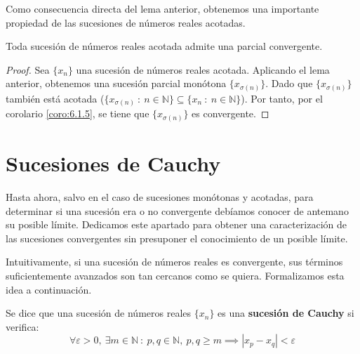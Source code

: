 Como consecuencia directa del lema anterior, obtenemos una importante propiedad de las sucesiones de números reales acotadas.
\begin{teo}
    Toda sucesión de números reales acotada admite una parcial convergente.
\end{teo}
\begin{proof}
    Sea $\{x_n\}$ una sucesión de números reales acotada. Aplicando el lema anterior, obtenemos una sucesión parcial monótona $\{x_{\sigma(n)}\}$. Dado que $\{x_{\sigma(n)}\}$ también está acotada ($\{x_{\sigma(n)} ~:~ n \in \mathbb{N}\} \subseteq \{x_n ~:~ n \in \mathbb{N}\}$). Por tanto, por el corolario \ref{coro:6.1.5}, se tiene que $\{x_{\sigma(n)}\}$ es convergente.
\end{proof}


\section{Sucesiones de Cauchy}
Hasta ahora, salvo en el caso de sucesiones monótonas y acotadas, para determinar si una sucesión era o no
convergente debíamos conocer de antemano su posible límite. Dedicamos este apartado para obtener una caracterización de las sucesiones convergentes sin presuponer el conocimiento de un posible límite.

Intuitivamente, si una sucesión de números reales es convergente, sus términos suficientemente avanzados son tan cercanos como se quiera. Formalizamos esta idea a continuación.
\begin{definicion}
    Se dice que una sucesión de números reales $\{x_n\}$ es una \textbf{sucesión de Cauchy} si verifica:
    \begin{equation*}
        \forall \varepsilon > 0, ~ \exists m \in \mathbb{N} ~:~ p,q \in \mathbb{N}, ~ p,q \geq m \implies |x_p - x_q| < \varepsilon
    \end{equation*}
\end{definicion}

